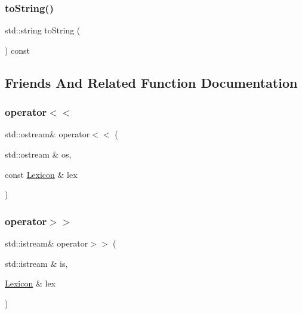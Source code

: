 \mbox{\label{classLexicon_a1fe5121d6528fdea3f243321b3fa3a49}} 
\subsubsection{\texorpdfstring{to\+String()}{toString()}}
{\footnotesize\ttfamily std\+::string to\+String (\begin{DoxyParamCaption}{ }\end{DoxyParamCaption}) const}



\subsection{Friends And Related Function Documentation}
\mbox{\label{classLexicon_af4dde954854b1ec1072266b3042d44a6}} 
\subsubsection{\texorpdfstring{operator$<$$<$}{operator<<}}
{\footnotesize\ttfamily std\+::ostream\& operator$<$$<$ (\begin{DoxyParamCaption}\item[{std\+::ostream \&}]{os,  }\item[{const \mbox{\hyperlink{classLexicon}{Lexicon}} \&}]{lex }\end{DoxyParamCaption})\hspace{0.3cm}{\ttfamily [friend]}}

\mbox{\label{classLexicon_a1f966ac4d3b3849aa4bc556d995c24ba}} 
\subsubsection{\texorpdfstring{operator$>$$>$}{operator>>}}
{\footnotesize\ttfamily std\+::istream\& operator$>$$>$ (\begin{DoxyParamCaption}\item[{std\+::istream \&}]{is,  }\item[{\mbox{\hyperlink{classLexicon}{Lexicon}} \&}]{lex }\end{DoxyParamCaption})\hspace{0.3cm}{\ttfamily [friend]}}

